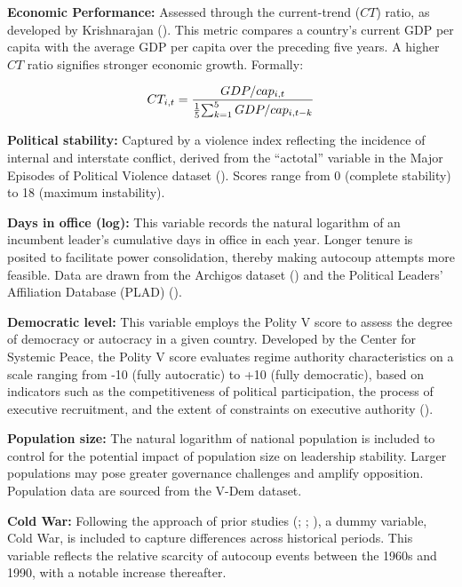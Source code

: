 \documentclass[
  12pt,
]{report}
\begin{document}
\textbf{Economic Performance:} Assessed through the current-trend
(\(CT\)) ratio, as developed by Krishnarajan
(). This metric compares a
country's current GDP per capita with the average GDP per capita over
the preceding five years. A higher \(CT\) ratio signifies stronger
economic growth. Formally:

\[
    \begin{aligned}
    CT_{i,t} = {GDP/cap_{i,t} \over {1 \over 5} {\sum_{k=1}^5GDP/cap_{i,t-k}}}
    \end{aligned}
\]

\textbf{Political stability:} Captured by a violence index reflecting
the incidence of internal and interstate conflict, derived from the
``actotal'' variable in the Major Episodes of Political Violence dataset
(). Scores
range from 0 (complete stability) to 18 (maximum instability).

\textbf{Days in office (log):} This variable records the natural
logarithm of an incumbent leader's cumulative days in office in each
year. Longer tenure is posited to facilitate power consolidation,
thereby making autocoup attempts more feasible. Data are drawn from the
Archigos dataset () and the Political Leaders' Affiliation Database (PLAD)
().

\textbf{Democratic level:} This variable employs the Polity V score to
assess the degree of democracy or autocracy in a given country.
Developed by the Center for Systemic Peace, the Polity V score evaluates
regime authority characteristics on a scale ranging from -10 (fully
autocratic) to +10 (fully democratic), based on indicators such as the
competitiveness of political participation, the process of executive
recruitment, and the extent of constraints on executive authority
().

\textbf{Population size:} The natural logarithm of national population
is included to control for the potential impact of population size on
leadership stability. Larger populations may pose greater governance
challenges and amplify opposition. Population data are sourced from the
V-Dem dataset.

\textbf{Cold War:} Following the approach of prior studies
(;
;
), a dummy variable,
Cold War, is included to capture differences across historical periods.
This variable reflects the relative scarcity of autocoup events between
the 1960s and 1990, with a notable increase thereafter.
\end{document}
